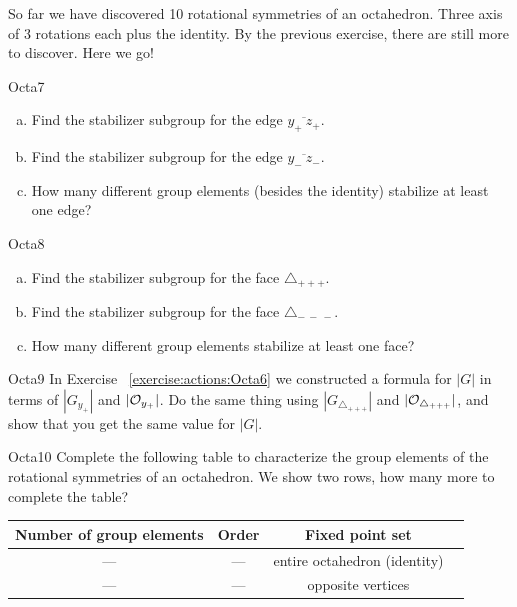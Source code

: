 So far we have discovered 10 rotational symmetries of an octahedron.  Three axis of 3 rotations each plus the identity.  By the previous exercise, there are still more to discover.  Here we go! 

\begin{exercise}{Octa7}
\begin{enumerate}[(a)]
\item Find the stabilizer subgroup for the edge $\overline{y_+~z_+}$. 
\item Find the stabilizer subgroup for the edge $\overline{y_-~z_-}$.
\item How many different group elements (besides the identity) stabilize at least one edge?
\end{enumerate}
\end{exercise}	

\begin{exercise}{Octa8}
\begin{enumerate}[(a)]
\item Find the stabilizer subgroup for the face $\triangle_{+ + +}$.
\item Find the stabilizer subgroup for the face $\triangle_{ -~-~-}$.
\item How many different group elements stabilize at least one face?
\end {enumerate}
\end{exercise}

\begin{exercise}{Octa9}
In Exercise ~\ref{exercise:actions:Octa6} we constructed a formula for $|G|$ in terms of $|G_{y_+}|$ and $|{\cal O}_{y_+}|$. Do the same thing using $|G_{\triangle_{+ + +}}|$ and $|{\cal O}_{\triangle_{+ + +}}|$, and show that you get the same value for $|G|$.
\end{exercise}

\begin{exercise}{Octa10}
Complete the following table to characterize the group elements of the rotational symmetries of an octahedron.  We show two rows, how many more to complete the table? 
 
\begin{tabular}{| c |c|c| r |} \hline
 \textbf{ Number of group elements} & \textbf{Order} & \textbf{Fixed point set} \\ \hline
  ---&  ---& entire  octahedron (identity) \\ \hline
  --- & ---&  opposite vertices \\

\end{tabular}
\end{exercise}

